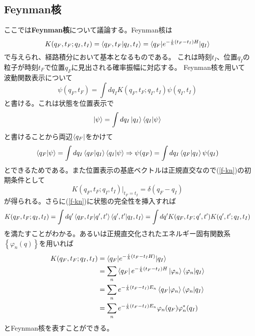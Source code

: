\documentclass[10pt]{jsarticle}
\newcommand{\nkakko}[1]{\left\{ #1 \right\}} %
\numberwithin{equation}{section}%
\begin{document}
\subsection{Feynman核}
ここでは{\bf Feynman核}について議論する。Feynman核は
\begin{equation}
 \label{f-kn} K(q_{F},t_{F};q_{I},t_{I})=\braket{q_{F},t_{F}|q_{I},t_{I}}=\braket{q_{F}|e^{-\frac{i}{\hbar}(t_{F}-t_{I})H}|q_{I}}
\end{equation}
で与えられ、経路積分において基本となるものである。
これは時刻$t_{I}$、位置$q_{I}$の粒子が時刻$t_{F}$で位置$q_{F}$に見出される確率振幅に対応する。
Feynman核を用いて波動関数表示について
\begin{equation}
  \psi(q_{F},t_{F})=\int dq_{I}K(q_{F},t_{F};q_{I},t_{I})\psi(q_{I},t_{I})
\end{equation}
と書ける。これは状態を位置表示で
\begin{equation}
  \ket{\psi}=\int dq_{I}\ket{q_{I}}\braket{q_{I}|\psi}
\end{equation}
と書けることから両辺$\bra{q_{F}}$をかけて
\begin{equation}
  \braket{q_{F}|\psi}=\int dq_{I}\braket{q_{F}|q_{I}}\braket{q_{I}|\psi}\Rightarrow \psi(q_{F}) =\int dq_{I}\braket{q_{F}|q_{I}}\psi(q_{I})
\end{equation}
とできるためである。また位置表示の基底ベクトルは正規直交なので(\ref{f-kn})の初期条件として
\begin{equation}
  K(q_{F},t_{F};q_{I},t_{I})|_{t_{F}=t_{I}}=\delta (q_{F}-q_{I})
\end{equation}
が得られる。さらに(\ref{f-kn})に状態の完全性を挿入すれば
\begin{equation}
  K(q_{F},t_{F};q_{I},t_{I})=\int dq' \braket{q_{F},t_{F}|q',t'} \braket{q',t'|q_{I},t_{I}}=\int dq' K(q_{F},t_{F};q',t')K(q',t';q_{I},t_{I})
\end{equation}
を満たすことがわかる。あるいは正規直交化されたエネルギー固有関数系$\nkakko{\varphi_{n}(q)}$を用いれば
\begin{align}
  K(q_{F},t_{F};q_{I},t_{I})&=\braket{q_{F}|e^{-\frac{i}{\hbar}(t_{F}-t_{I}H)}|q_{I}}\notag \\
  &=\sum_{n}\bra{q_{F}}e^{-\frac{i}{\hbar}(t_{F}-t_{I})H}\ket{\varphi_{n}} \braket{\varphi_{n}|q_{I}}\notag \\
&=\sum_{n}e^{-\frac{i}{\hbar}(t_{F}-t_{I})E_{n}}\braket{q_{F}|\varphi_{n}} \braket{\varphi_{n}|q_{I}}\notag \\
&=\sum_{n}e^{-\frac{i}{\hbar}(t_{F}-t_{I})E_{n}}\varphi_{n}(q_{F})\varphi_{n}^{*}(q_{I})
\end{align}
とFeynman核を表すことができる。
\end{document}
